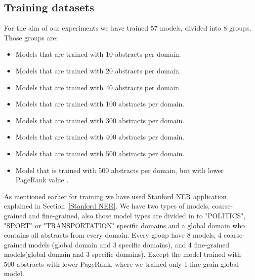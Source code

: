 \documentclass[thesis=M,english]{FITthesis}[2018/05/30]
\begin{document}
	\subsection{Training datasets}
	For the aim of our experiments we have trained 57 models, divided into 8 groups. Those groups are:
\begin{itemize}
	\item Models that are trained with 10 abstracts per domain.
	\item Models that are trained with 20 abstracts per domain.
	\item Models that are trained with 40 abstracts per domain.
	\item Models that are trained with 100 abstracts per domain.
	\item Models that are trained with 300 abstracts per domain.
	\item Models that are trained with 400 abstracts per domain.
	\item Models that are trained with 500 abstracts per domain.
	\item Model that is trained with 500 abstracts per domain, but with lower PageRank value .
\end{itemize}
	
	 As mentioned earlier for training we have used Stanford NER application explained in Section~\ref{Stanford NER}. We have two types of models, coarse-grained and fine-grained, also those model types are divided in to "POLITICS", "SPORT" or "TRANSPORTATION" specific domains and a global domain who contains all abstracts from every domain. 
	 Every group have 8 models, 4 coarse-grained models (global domain and 3 specific domains), and 4 fine-grained models(global domain and 3 specific domains). Except the model trained with 500 abstracts with lower PageRank, where we trained only 1 fine-grain global model.
	 
	 
\end{document}
